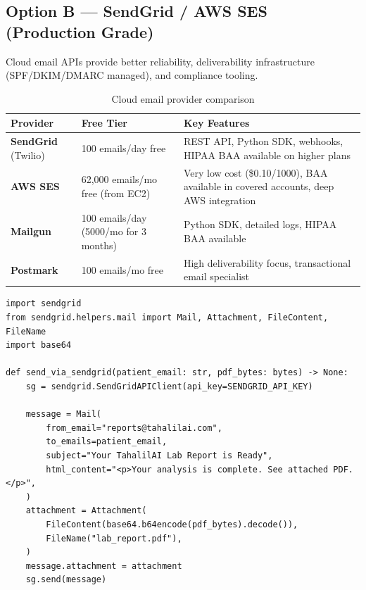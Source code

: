 \documentclass[12pt,a4paper]{article}
\begin{document}
\subsection{Option B --- SendGrid / AWS SES (Production Grade)}

Cloud email APIs provide better reliability, deliverability infrastructure
(SPF/DKIM/DMARC managed), and compliance tooling.

\begin{table}[h!]
\centering
\begin{tabularx}{\linewidth}{l X X}
\toprule
\textbf{Provider} & \textbf{Free Tier} & \textbf{Key Features} \\
\midrule
\rowcolor{rowA}
\textbf{SendGrid} (Twilio) &
    100 emails/day free &
    REST API, Python SDK, webhooks, HIPAA BAA available on higher plans \\
\textbf{AWS SES} &
    62,000 emails/mo free (from EC2) &
    Very low cost (\$0.10/1000), BAA available in covered accounts,
    deep AWS integration \\
\rowcolor{rowA}
\textbf{Mailgun} &
    100 emails/day (5000/mo for 3 months) &
    Python SDK, detailed logs, HIPAA BAA available \\
\textbf{Postmark} &
    100 emails/mo free &
    High deliverability focus, transactional email specialist \\
\bottomrule
\end{tabularx}
\caption{Cloud email provider comparison}
\end{table}

\begin{lstlisting}[style=python, caption={SendGrid API email (Python SDK)}]
import sendgrid
from sendgrid.helpers.mail import Mail, Attachment, FileContent, FileName
import base64

def send_via_sendgrid(patient_email: str, pdf_bytes: bytes) -> None:
    sg = sendgrid.SendGridAPIClient(api_key=SENDGRID_API_KEY)

    message = Mail(
        from_email="reports@tahalilai.com",
        to_emails=patient_email,
        subject="Your TahalilAI Lab Report is Ready",
        html_content="<p>Your analysis is complete. See attached PDF.</p>",
    )
    attachment = Attachment(
        FileContent(base64.b64encode(pdf_bytes).decode()),
        FileName("lab_report.pdf"),
    )
    message.attachment = attachment
    sg.send(message)
\end{lstlisting}
\end{document}
